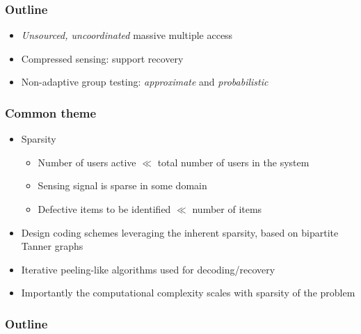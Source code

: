 \documentclass[10pt,usenames,dvipsnames]{beamer}
\begin{document}
\begin{frame}
\frametitle{Outline}
\begin{itemize}
\setlength{\itemsep}{6pt}
\item \emph{Unsourced, uncoordinated} massive multiple access
\item Compressed sensing: support recovery
\item Non-adaptive group testing: \emph{approximate} and \emph{probabilistic}
\end{itemize}
\end{frame}

\begin{frame} 
\frametitle{Common theme}
\begin{itemize}
	\setlength{\itemsep}{4pt}
	\item {\color{blue}Sparsity}
	\begin{itemize}
	\setlength{\itemsep}{3pt}
		\item Number of users active $\ll$ total number of users in the system
		\item Sensing signal is sparse in some domain
		\item Defective items to be identified $\ll$ number of items
	\end{itemize}
	\pause
	\item Design coding 	schemes leveraging the inherent sparsity, based on {\color{blue}bipartite Tanner graphs}
	\item {\color{blue} Iterative peeling}-like algorithms used for decoding/recovery 
	\pause
	\item Importantly the {\color{blue} computational complexity scales with sparsity} of the problem
\end{itemize}
\end{frame}

\begin{frame}
	\frametitle{Outline}
	\tableofcontents
\end{frame}
\end{document}
